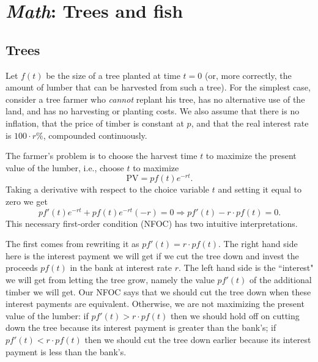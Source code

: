 \chapter{\emph{Math}: Trees and fish}
\label{1treesfish}

\section{Trees}       %
\label{treebasic}

Let $f(t)$ be the size of a tree planted at time $t=0$ (or, more correctly, the amount of lumber that can be harvested from such a tree). For the simplest case, consider a tree farmer who \emph{cannot} replant his tree, has no alternative use of the land, and has no harvesting or planting costs. We also assume that there is no inflation, that the price of timber is constant at $p$, and that the real interest rate is $100\cdot r\%$, compounded continuously.

The farmer's problem is to choose the harvest time $t$ to maximize the present value of the lumber, i.e., choose $t$ to maximize
\[
\mbox{PV}=pf(t)e^{-rt}.
\]
Taking a derivative with respect to the choice variable $t$ and setting it equal to zero we get
\[
pf'(t)e^{-rt} + pf(t)e^{-rt}(-r)=0\Longrightarrow pf'(t)-r\cdot
pf(t)=0.
\]
This necessary first-order condition (NFOC) has two intuitive interpretations.

The first comes from rewriting it as $pf'(t)=r\cdot pf(t)$. The right hand side here is the interest payment we will get if we cut the tree down and invest the proceeds $pf(t)$ in the bank at interest rate $r$. The left hand side is the ``interest" we will get from letting the tree grow, namely the value $pf'(t)$ of the additional timber we will get. Our NFOC says that we should cut the tree down when these interest payments are equivalent. Otherwise, we are not maximizing the present value of the lumber: if $pf'(t)>r\cdot pf(t)$ then we should hold off on cutting down the tree because its interest payment is greater than the bank's; if $pf'(t)<r\cdot pf(t)$ then we should cut the tree down earlier because its interest payment is less than the bank's.

